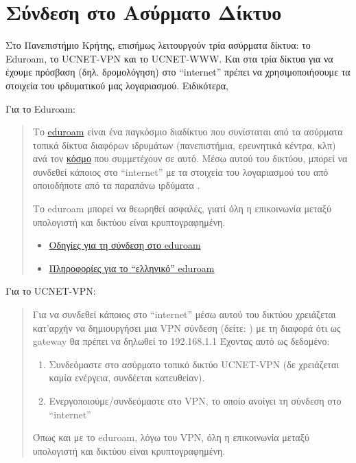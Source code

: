 \documentclass[a4paper,11pt,greek]{article}
\begin{document}
\section{Σύνδεση στο Ασύρματο Δίκτυο}
\label{HowToWifi::doc}\label{HowToWifi:id1}
Στο Πανεπιστήμιο Κρήτης, επισήμως λειτουργούν τρία ασύρματα δίκτυα: το Eduroam,
το UCNET-VPN και το UCNET-WWW. Και στα τρία δίκτυα για να έχουμε πρόσβαση
(δηλ. δρομολόγηση) στο ``internet'' πρέπει να χρησιμοποιήσουμε τα στοιχεία του
ιρδυματικού μας λογαριασμού. Ειδικότερα,

Για το Eduroam:
\begin{quote}

Το \href{https://www.eduroam.org/}{eduroam} είναι ένα παγκόσμιο διαδίκτυο που συνίσταται από τα ασύρματα τοπικά δίκτυα διαφόρων ιδρυμάτων (πανεπιστήμια, ερευνητικά κέντρα, κλπ) ανά τον \href{https://monitor.eduroam.org/eduroam\_map.php?type=all}{κόσμο} που συμμετέχουν σε αυτό. Μέσω αυτού του δικτύου, μπορεί να συνδεθεί κάποιος στο ``internet'' με τα στοιχεία του λογαριασμού του από οποιοδήποτε από τα παραπάνω ιρδύματα .

Το eduroam μπορεί να θεωρηθεί ασφαλές, γιατί όλη η επικοινωνία μεταξύ υπολογιστή και δικτύου είναι κρυπτογραφημένη.
\begin{itemize}
\item {} 
\href{http://www.wifi.uoc.gr/guide.php}{Οδηγίες για τη σύνδεση στο eduroam}

\item {} 
\href{https://www.eduroam.gr}{Πληροφορίες για το ``ελληνικό'' eduroam}

\end{itemize}
\end{quote}

Για το UCNET-VPN:
\begin{quote}

Για να συνδεθεί κάποιος στο ``internet'' μέσω αυτού του δικτύου χρειάζεται κατ'αρχήν να δημιουργήσει μια VPN σύνδεση (δείτε: {\hyperref[HowToVPN::doc]{}}) με τη διαφορά ότι ως gateway θα πρέπει να δηλωθεί το 192.168.1.1
Έχοντας αυτό ως δεδομένο:
\begin{enumerate}
\item {} 
Συνδεόμαστε στο ασύρματο τοπικό δικτύο UCNET-VPN (δε χρειάζεται καμία ενέργεια, συνδέεται κατευθείαν).

\item {} 
Ενεργοποιούμε/συνδεόμαστε στο VPN, το οποίο ανοίγει τη σύνδεση στο ``internet''

\end{enumerate}

Όπως και με το eduroam, λόγω του VPN, όλη η επικοινωνία μεταξύ υπολογιστή και δικτύου είναι κρυπτογραφημένη.
\end{quote}
\end{document}
